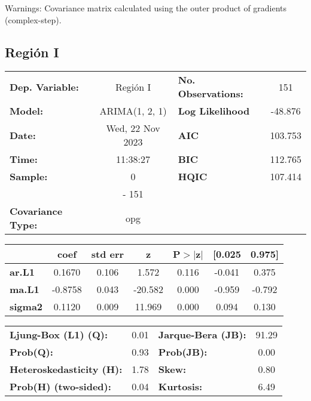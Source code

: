 \documentclass{article}%
\begin{document}
Warnings: \newline
 [1] Covariance matrix calculated using the outer product of gradients (complex-step).%
\subsection*{Región I}%
\begin{center}
\begin{tabular}{lclc}
\toprule
\textbf{Dep. Variable:}          &     Región I     & \textbf{  No. Observations:  } &    151      \\
\textbf{Model:}                  &  ARIMA(1, 2, 1)  & \textbf{  Log Likelihood     } &  -48.876    \\
\textbf{Date:}                   & Wed, 22 Nov 2023 & \textbf{  AIC                } &  103.753    \\
\textbf{Time:}                   &     11:38:27     & \textbf{  BIC                } &  112.765    \\
\textbf{Sample:}                 &        0         & \textbf{  HQIC               } &  107.414    \\
\textbf{}                        &       - 151      & \textbf{                     } &             \\
\textbf{Covariance Type:}        &       opg        & \textbf{                     } &             \\
\bottomrule
\end{tabular}
\begin{tabular}{lcccccc}
                & \textbf{coef} & \textbf{std err} & \textbf{z} & \textbf{P$> |$z$|$} & \textbf{[0.025} & \textbf{0.975]}  \\
\midrule
\textbf{ar.L1}  &       0.1670  &        0.106     &     1.572  &         0.116        &       -0.041    &        0.375     \\
\textbf{ma.L1}  &      -0.8758  &        0.043     &   -20.582  &         0.000        &       -0.959    &       -0.792     \\
\textbf{sigma2} &       0.1120  &        0.009     &    11.969  &         0.000        &        0.094    &        0.130     \\
\bottomrule
\end{tabular}
\begin{tabular}{lclc}
\textbf{Ljung-Box (L1) (Q):}     & 0.01 & \textbf{  Jarque-Bera (JB):  } & 91.29  \\
\textbf{Prob(Q):}                & 0.93 & \textbf{  Prob(JB):          } &  0.00  \\
\textbf{Heteroskedasticity (H):} & 1.78 & \textbf{  Skew:              } &  0.80  \\
\textbf{Prob(H) (two-sided):}    & 0.04 & \textbf{  Kurtosis:          } &  6.49  \\
\bottomrule
\end{tabular}
\end{center}
\end{document}
